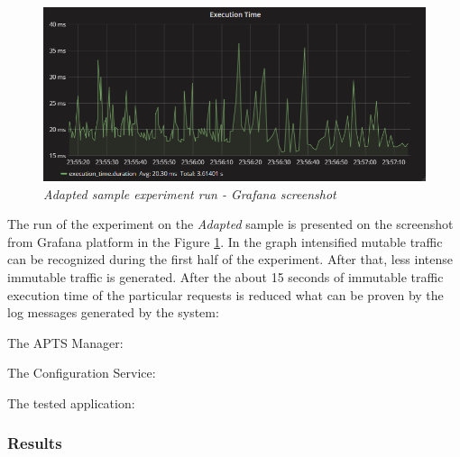 \documentclass[12pt,a4paper]{article}
\begin{document}
\begin{figure}[!htb]
\centering
\includegraphics[width=1\textwidth]{cacheEval2}
\caption{\textit{Adapted sample experiment run - Grafana screenshot}} \label{figure:cachegraphanascreen}
\end{figure}

The run of the experiment on the \textit{Adapted} sample is presented on the screenshot from Grafana platform in the Figure \ref{figure:cachegraphanascreen}. In the graph intensified mutable traffic can be recognized during the first half of the experiment. After that, less intense immutable traffic is generated. After the about 15 seconds of immutable traffic execution time of the particular requests is reduced what can be proven by the log messages generated by the system:

The APTS Manager:

\noindent{}\vspace{1mm}

The Configuration Service:

\vspace{1mm}\noindent{}\vspace{1mm}

The tested application:

\vspace{1mm}\noindent{}\vspace{1mm}
 

\subsubsection{Results} 
\end{document}
